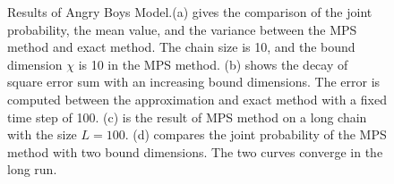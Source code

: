 \documentclass[english]{article}
\begin{document}
\begin{figure}[htbp]
  \caption{Results of Angry Boys Model.(a) gives the comparison of the joint probability, the mean value, and the variance between the MPS method and exact method. The chain size is 10, and the bound dimension $\chi$ is 10 in the MPS method. (b) shows the decay of square error sum with an increasing bound dimensions. The error is computed between the approximation and exact method with a fixed time step of 100. (c) is the result of MPS method on a long chain with the size $L=100$. (d) compares the joint probability of the MPS method with two bound dimensions. The two curves converge in the long run.}
  \label{fig:Angry_result}
\end{figure}
\end{document}
